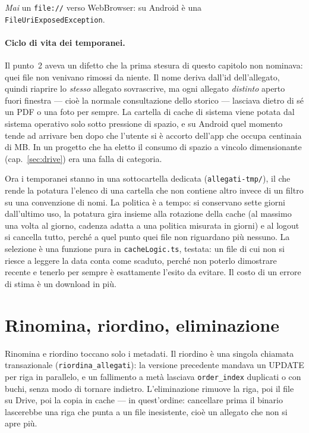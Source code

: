 \documentclass[11pt,a4paper]{report}
\begin{document}
\emph{Mai} un \texttt{file://} verso WebBrowser: su Android \`e una
\texttt{FileUriExposedException}.

\paragraph{Ciclo di vita dei temporanei.} Il punto~2 aveva un difetto che la
prima stesura di questo capitolo non nominava: quei file non venivano
rimossi da niente. Il nome deriva dall'id dell'allegato, quindi riaprire lo
\emph{stesso} allegato sovrascrive, ma ogni allegato \emph{distinto} aperto
fuori finestra --- cio\`e la normale consultazione dello storico --- lasciava
dietro di s\'e un PDF o una foto per sempre. La cartella di cache di sistema
viene potata dal sistema operativo solo sotto pressione di spazio, e su
Android quel momento tende ad arrivare ben dopo che l'utente si \`e accorto
dell'app che occupa centinaia di MB. In un progetto che ha eletto il consumo
di spazio a vincolo dimensionante (cap.~\ref{sec:drive}) era una falla di
categoria.

Ora i temporanei stanno in una sottocartella dedicata
(\texttt{allegati-tmp/}), il che rende la potatura l'elenco di una cartella
che non contiene altro invece di un filtro su una convenzione di nomi. La
politica \`e a tempo: si conservano sette giorni dall'ultimo uso, la
potatura gira insieme alla rotazione della cache (al massimo una volta al
giorno, cadenza adatta a una politica misurata in giorni) e al logout si
cancella tutto, perch\'e a quel punto quei file non riguardano pi\`u nessuno.
La selezione \`e una funzione pura in \texttt{cacheLogic.ts}, testata: un file
di cui non si riesce a leggere la data conta come scaduto, perch\'e non
poterlo dimostrare recente e tenerlo per sempre \`e esattamente l'esito da
evitare. Il costo di un errore di stima \`e un download in pi\`u.

\section{Rinomina, riordino, eliminazione}

Rinomina e riordino toccano solo i metadati. Il riordino \`e una singola
chiamata transazionale (\texttt{riordina\_allegati}): la versione precedente
mandava un UPDATE per riga in parallelo, e un fallimento a met\`a lasciava
\texttt{order\_index} duplicati o con buchi, senza modo di tornare indietro.
L'eliminazione rimuove la riga, poi il file su Drive, poi la copia in cache --- in
quest'ordine: cancellare prima il binario lascerebbe una riga che punta a un
file inesistente, cio\`e un allegato che non si apre pi\`u.
\end{document}
